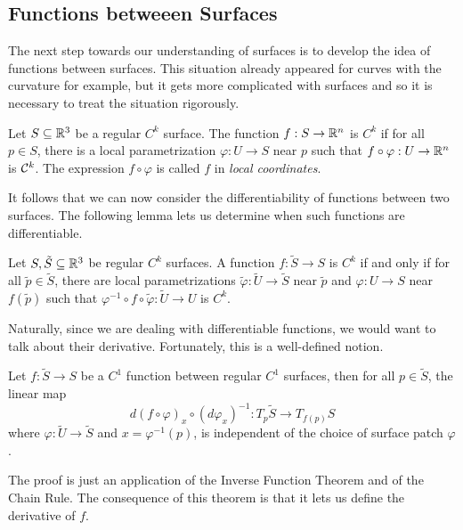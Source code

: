 \subsection{Functions betweeen Surfaces}

The next step towards our understanding of surfaces is to develop the idea of functions between surfaces. This situation already appeared for curves with the curvature for example, but it gets more complicated with surfaces and so it is necessary to treat the situation rigorously.

\begin{definition}
    Let $S \subseteq \mathbb{R}^3$ be a regular $C^k$ surface. The function $f: S \to \mathbb{R}^n$ is $C^k$ if for all $p \in S$, there is a local parametrization $\varphi : U \to S$ near $p$ such that $f \circ \varphi : U \to \mathbb{R}^n$ is $\mathcal{C}^k$. The expression $f\circ \varphi$ is called $f$ in \textit{local coordinates}.
\end{definition}

It follows that we can now consider the differentiability of functions between two surfaces. The following lemma lets us determine when such functions are differentiable.

\begin{lemma}
    Let $S,\tilde{S} \subseteq \mathbb{R}^3$ be regular $C^k$ surfaces. A function $f : \tilde{S} \to S$ is $C^k$ if and only if for all $\tilde{p} \in \tilde{S}$, there are local parametrizations $\tilde{\varphi} : \tilde{U} \to \tilde{S}$ near $\tilde{p}$ and $\varphi : U \to S$ near $f(\tilde{p})$ such that $\varphi^{-1} \circ f \circ \tilde{\varphi} : \tilde{U} \to U$ is $C^k$.
\end{lemma}

Naturally, since we are dealing with differentiable functions, we would want to talk about their derivative. Fortunately, this is a well-defined notion. 
\begin{proposition}
    Let $f : \tilde{S} \to S$ be a $C^1$ function between regular $C^1$ surfaces, then for all $p \in \tilde{S}$, the linear map
    $$d(f \circ \varphi)_x \circ \left(d\varphi_x\right)^{-1} : T_p\tilde{S} \to T_{f(p)}S$$
    where $\varphi : \tilde{U} \to \tilde{S}$ and $x = \varphi^{-1}(p)$, is independent of the choice of surface patch $\varphi$.
\end{proposition}

The proof is just an application of the Inverse Function Theorem and of the Chain Rule. The consequence of this theorem is that it lets us define the derivative of $f$.

